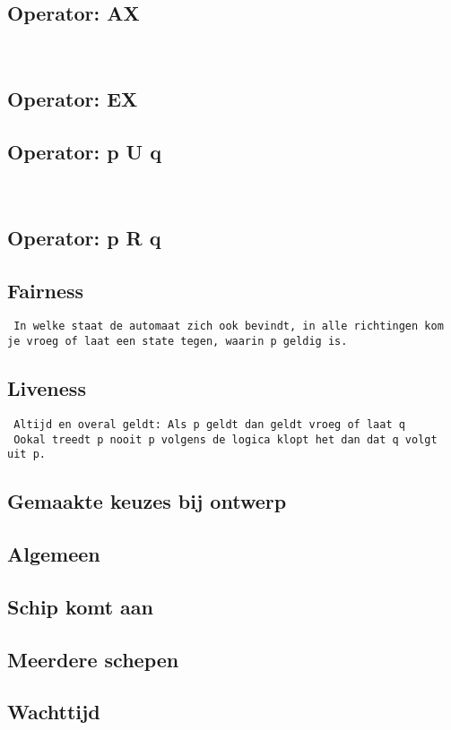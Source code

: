 \documentclass{article}
\begin{document}
\subsection{Operator: AX}

~\cite{locke_2020}
\subsection{Operator: EX}

\subsection{Operator: p U q}
~\cite{gnsguides}
\subsection{Operator: p R q}

\subsection{Fairness}
\begin{verbatim}
 In welke staat de automaat zich ook bevindt, in alle richtingen kom je vroeg of laat een state tegen, waarin p geldig is.
\end{verbatim}
\subsection{Liveness}
\begin{verbatim}
 Altijd en overal geldt: Als p geldt dan geldt vroeg of laat q
 Ookal treedt p nooit p volgens de logica klopt het dan dat q volgt uit p.
\end{verbatim}
\newpage
\subsection{Gemaakte keuzes bij ontwerp}
\subsection{Algemeen}
\subsection{Schip komt aan}
\subsection{Meerdere schepen}
\subsection{Wachttijd}
\end{document}
